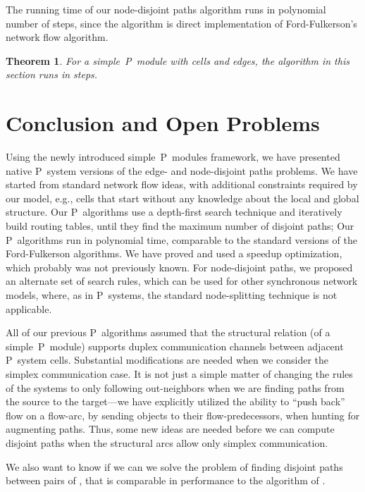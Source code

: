 \documentclass[preliminary,copyright,creativecommons]{eptcs}
\newtheorem{theorem}{Theorem}
\theoremstyle{remark}
\begin{document}
\medskip

The running time of our node-disjoint paths algorithm runs in
polynomial number of steps, since the algorithm is 
direct implementation of Ford-Fulkerson's network flow algorithm.

\begin{theorem}
For a simple~P~module with  cells and  edges,
the algorithm in this section runs in  steps.
\end{theorem}


\section{Conclusion and Open Problems}
\label{sec-conclusion}

Using the newly introduced simple~P~modules framework,
we have presented native P~system versions 
of the edge- and node-disjoint paths problems.
We have started from standard network flow ideas,
with additional constraints required by our model,
e.g., cells that start without any knowledge about the local and global structure. 
Our P~algorithms use a depth-first search technique
and iteratively build routing tables, 
until they find the maximum number of disjoint paths;
Our P~algorithms run in polynomial time, 
comparable to the standard versions of the Ford-Fulkerson algorithms.   
We have proved and used a speedup optimization,
which probably was not previously known.
For node-disjoint paths, we proposed an alternate set of search rules, 
which can be used for other synchronous network models, where, as in P~systems, 
the standard node-splitting technique is not applicable.

All of our previous P~algorithms assumed that the structural relation  
(of a simple~P~module) 
supports duplex communication channels between adjacent P~system cells.  
Substantial modifications are needed when we consider the simplex communication case.  
It is not just a simple matter of changing the rules of the systems to 
only following out-neighbors when we are finding paths from the source 
to the target---we have explicitly utilized the ability to ``push back'' flow 
on a flow-arc, by sending objects to their flow-predecessors, 
when hunting for augmenting paths.  
Thus, some new ideas are needed before we can compute disjoint paths 
when the structural arcs allow only simplex communication.

We also want to know if we can we solve the problem of finding disjoint paths 
between  pairs of , 
that is comparable in performance to the  algorithm of \cite{RobertsonS1995}.
\end{document}
